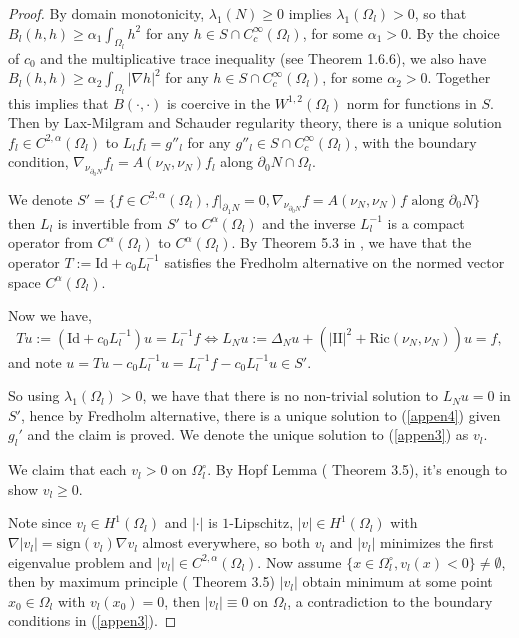 \documentclass[12pt]{amsart}
\newcommand{\sff}{\mathrm{I\!I}}
\newcommand{\Ric}{\text{Ric}}
\newcommand{\p}{\partial}
\numberwithin{equation}{section}
\begin{document}
\begin{proof}
	By domain monotonicity, $\lambda_1(N)\geq 0$ implies $\lambda_1(\Omega_l)>0$, so that  $B_l(h,h)\geq \alpha_1\int_{\Omega_l}h^2$ for any $h\in S\cap C^{\infty}_c(\Omega_l)$, for some $\alpha_1 >0$. By the choice of $c_0$ and the multiplicative trace inequality (see \cite{brenner2008mathematical} Theorem 1.6.6), we also have $B_l(h,h)\geq \alpha_2 \int_{\Omega_l}|\nabla h|^2 $ for any $h\in S\cap C^{\infty}_c(\Omega_l)$, for some $\alpha_2 >0$. Together this implies that $B(\cdot, \cdot)$ is coercive in the $W^{1,2}(\Omega_l)$ norm for functions in $S$. Then by Lax-Milgram and Schauder regularity theory, there is a unique solution $f_l\in C^{2,\alpha}(\Omega_l)$ to $L_lf_l=g''_l$ for any $g''_l \in S\cap C^{\infty}_c(\Omega_l)$, with the boundary condition, $\nabla_{\nu_{\p_0 N}}f_l=A(\nu_N,\nu_N)f_l$ along $\p_0 N \cap \Omega_l$. 
	
	We denote $S'=\{f\in C^{2,\alpha}(\Omega_l), f\rvert_{\p_1 N}=0, \nabla_{\nu_{\p_0N}}f=A(\nu_N,\nu_N)f\text{ along } \p_0N\}$ then $L_l$ is invertible from $S'$ to $C^{\alpha}(\Omega_l)$ and the inverse $L^{-1}_l$ is a compact operator from $C^{\alpha}(\Omega_l)$ to $C^{\alpha}(\Omega_l)$. By Theorem 5.3 in \cite{GilbaTrudi2001-EllipticPartialDifferential}, we have that the operator $T:=\text{Id}+c_0L_l^{-1}$ satisfies the Fredholm alternative on the normed vector space $C^{\alpha}(\Omega_l)$.
	
	Now we have,
	\begin{equation*}
		Tu:=(\text{Id}+c_0L^{-1}_l)u=L^{-1}_lf \iff L_N u:=\Delta_N u+(|\sff|^2+\Ric(\nu_N,\nu_N))u=f,
	\end{equation*}
	and note $u=Tu-c_0L^{-1}_lu=L^{-1}_lf-c_0L^{-1}_lu\in S'$.
	
	So using $\lambda_1(\Omega_l)>0$, we have that there is no non-trivial solution to $L_Nu=0$ in $S'$, hence by Fredholm alternative, there is a unique solution to (\ref{appen4}) given $g_l'$ and the claim is proved. We denote the unique solution to (\ref{appen3}) as $v_l$.


	
		
		
	We claim that each $v_l>0$ on $\Omega_l^{\circ}$. By Hopf Lemma (\cite{GilbaTrudi2001-EllipticPartialDifferential} Theorem 3.5), it's enough to show $v_l \geq 0$.

	
	Note since $v_l\in H^1(\Omega_l)$ and $|\cdot|$ is $1$-Lipschitz, $|v|\in H^1(\Omega_l)$ with $\nabla |v_l|=\text{sign}(v_l)\nabla v_l$ almost everywhere, so both $v_l$ and $|v_l|$ minimizes the first eigenvalue problem and $|v_l|\in C^{2,\alpha}(\Omega_l)$. Now assume $\{x\in \Omega^{\circ}_l, v_l(x) <0\} \neq \emptyset$, then by maximum principle (\cite{GilbaTrudi2001-EllipticPartialDifferential} Theorem 3.5) $|v_l|$ obtain minimum at some point $x_0\in \Omega_l$ with $v_l(x_0)=0$, then $|v_l|\equiv 0$ on $\Omega_l$, a contradiction to the boundary conditions in (\ref{appen3}).
	

\end{proof}
\end{document}

